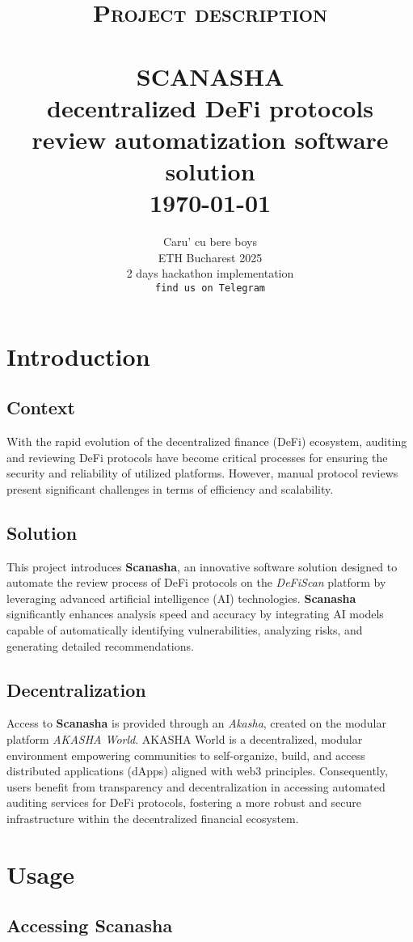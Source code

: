 \documentclass[paper=a4, fontsize=11pt,twoside]{scrartcl}
\title{	\normalsize \textsc{Project description} 
		 	\\[2.0cm]								
			\HRule{0.5pt} \\					
			\LARGE \textbf{\uppercase{Scanasha} \\ \vspace{0.1cm} decentralized DeFi protocols review automatization software solution}
			\HRule{2pt} \\ [0.5cm]		
			\normalsize \today
		}
\author{
		Caru' cu bere boys \\	
		ETH Bucharest 2025\\	
		2 days hackathon implementation\\
        \texttt{find us on Telegram} \\
}
\makeatletter
\def\printtitle{%
    {\centering \@title\par}}
\def\printauthor{%
    {\centering \large \@author}}
\makeatother
\begin{document}
\thispagestyle{empty}
\printtitle	
  	\vfill
\printauthor
\newpage

\setcounter{page}{1}
\section{Introduction}

\subsection{Context}
With the rapid evolution of the decentralized finance (DeFi) ecosystem, auditing and reviewing DeFi protocols have become critical processes for ensuring the security and reliability of utilized platforms. However, manual protocol reviews present significant challenges in terms of efficiency and scalability.

\subsection{Solution}
This project introduces \textbf{Scanasha}, an innovative software solution designed to automate the review process of DeFi protocols on the \textit{DeFiScan} platform by leveraging advanced artificial intelligence (AI) technologies. \textbf{Scanasha} significantly enhances analysis speed and accuracy by integrating AI models capable of automatically identifying vulnerabilities, analyzing risks, and generating detailed recommendations.

\subsection{Decentralization}
Access to \textbf{Scanasha} is provided through an \textit{Akasha}, created on the modular platform \textit{AKASHA World}. AKASHA World is a decentralized, modular environment empowering communities to self-organize, build, and access distributed applications (dApps) aligned with web3 principles. Consequently, users benefit from transparency and decentralization in accessing automated auditing services for DeFi protocols, fostering a more robust and secure infrastructure within the decentralized financial ecosystem.

\section{Usage}

\subsection{Accessing Scanasha}
\end{document}

